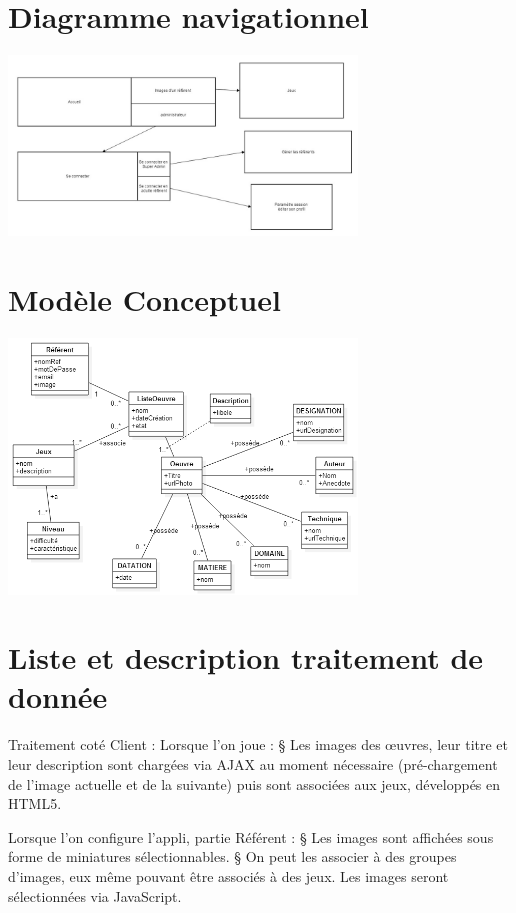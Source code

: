 \documentclass[12pt,a4paper]{report}
\begin{document}
 



\chapter{ Diagramme navigationnel}
\includegraphics[width=350px]{../../UML/diagramme_navigationnel.jpg}\\

\chapter{Modèle Conceptuel}
\includegraphics[width=350px]{../../UML/diagrammeClasse.png}\\


\chapter{Liste et description traitement de donnée}
Traitement coté Client : 
Lorsque l’on joue :
§  Les images des œuvres, leur titre et leur description sont chargées via AJAX au moment nécessaire (pré-chargement de l’image actuelle et de la suivante) puis sont associées aux jeux, développés en HTML5.
 
Lorsque l’on configure l’appli, partie Référent :
§  Les images sont affichées sous forme de miniatures sélectionnables.
§  On peut les associer à des groupes d’images, eux même pouvant être associés à des jeux. Les images seront sélectionnées via JavaScript.
 
\end{document}
